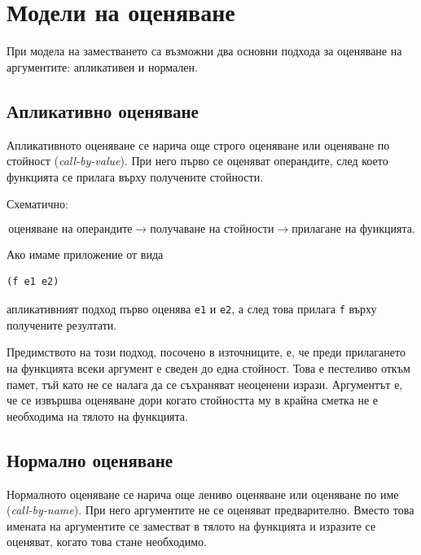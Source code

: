 \section{Модели на оценяване}\label{s:19.3}

При модела на заместването са възможни два основни подхода за оценяване на аргументите: апликативен и нормален.

\subsection{Апликативно оценяване}\label{s:19.3.1}

\begin{defn}
Апликативното оценяване се нарича още строго оценяване или оценяване по стойност (\textit{call-by-value}). При него първо се оценяват операндите, след което функцията се прилага върху получените стойности.
\end{defn}

Схематично:

\[
\text{оценяване на операндите}
\longrightarrow
\text{получаване на стойности}
\longrightarrow
\text{прилагане на функцията}.
\]

Ако имаме приложение от вида

\begin{verbatim}
(f e1 e2)
\end{verbatim}

апликативният подход първо оценява \texttt{e1} и \texttt{e2}, а след това прилага \texttt{f} върху получените резултати.

Предимството на този подход, посочено в източниците, е, че преди прилагането на функцията всеки аргумент е сведен до една стойност. Това е пестеливо откъм памет, тъй като не се налага да се съхраняват неоценени изрази. Аргументът е, че се извършва оценяване дори когато стойността му в крайна сметка не е необходима на тялото на функцията.

\subsection{Нормално оценяване}\label{s:19.3.2}

\begin{defn}
Нормалното оценяване се нарича още лениво оценяване или оценяване по име (\textit{call-by-name}). При него аргументите не се оценяват предварително. Вместо това имената на аргументите се заместват в тялото на функцията и изразите се оценяват, когато това стане необходимо.
\end{defn}

